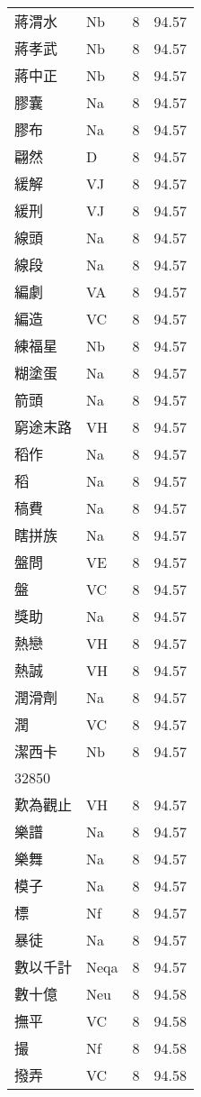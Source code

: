 \documentclass[twocolumn]{book}
\begin{document}
\begin{supertabular}{llrr}
蔣渭水 & Nb & 8 &  94.57\\
蔣孝武 & Nb & 8 &  94.57\\
蔣中正 & Nb & 8 &  94.57\\
膠囊 & Na & 8 &  94.57\\
膠布 & Na & 8 &  94.57\\
翩然 & D & 8 &  94.57\\
緩解 & VJ & 8 &  94.57\\
緩刑 & VJ & 8 &  94.57\\
線頭 & Na & 8 &  94.57\\
線段 & Na & 8 &  94.57\\
編劇 & VA & 8 &  94.57\\
編造 & VC & 8 &  94.57\\
練福星 & Nb & 8 &  94.57\\
糊塗蛋 & Na & 8 &  94.57\\
箭頭 & Na & 8 &  94.57\\
窮途末路 & VH & 8 &  94.57\\
稻作 & Na & 8 &  94.57\\
稻 & Na & 8 &  94.57\\
稿費 & Na & 8 &  94.57\\
瞎拼族 & Na & 8 &  94.57\\
盤問 & VE & 8 &  94.57\\
盤 & VC & 8 &  94.57\\
獎助 & Na & 8 &  94.57\\
熱戀 & VH & 8 &  94.57\\
熱誠 & VH & 8 &  94.57\\
潤滑劑 & Na & 8 &  94.57\\
潤 & VC & 8 &  94.57\\
潔西卡 & Nb & 8 &  94.57\\
32850\\
歎為觀止 & VH & 8 &  94.57\\
樂譜 & Na & 8 &  94.57\\
樂舞 & Na & 8 &  94.57\\
模子 & Na & 8 &  94.57\\
標 & Nf & 8 &  94.57\\
暴徒 & Na & 8 &  94.57\\
數以千計 & Neqa & 8 &  94.57\\
數十億 & Neu & 8 &  94.58\\
撫平 & VC & 8 &  94.58\\
撮 & Nf & 8 &  94.58\\
撥弄 & VC & 8 &  94.58\\

\end{supertabular}
\end{document}
